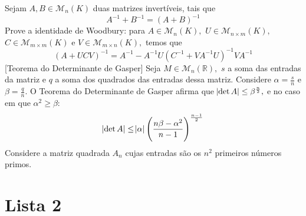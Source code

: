 \documentclass[11pt,a4paper]{article}
\begin{document}
 Sejam $A, B \in \mathcal{M}_n(K)$ duas matrizes invertíveis, tais que
\[
A^{-1} + B^{-1} = (A + B)^{-1}
\]
    \solucao{}
     Prove a identidade de Woodbury: para $A \in \mathcal{M}_n(K),$ $U \in \mathcal{M}_{n \times m}(K),$ $C \in \mathcal{M}_{m \times m}(K)$ e $V \in \mathcal{M}_{m \times n}(K),$ temos que
    \[\left(A + UCV \right)^{-1} = A^{-1} - A^{-1}U \left(C^{-1} + VA^{-1}U \right)^{-1} VA^{-1}
    \]
    \solucao{}
     [Teorema do Determinante de Gasper] 
    Seja $M \in \mathcal{M}_n(\mathbb{R}),$ $s$ a soma das entradas da matriz e $q$ a soma dos quadrados das entradas dessa matriz. Considere $\alpha = \frac{s}{n}$ e $\beta = \frac{q}{n}.$ O Teorema do Determinante de Gasper afirma que $\abs{\det A} \le \beta^{\frac{n}{2}},$ e no caso em que $\alpha^2 \ge \beta:$
    \[
    \abs{\det A} \le \abs{\alpha} \left(  \frac{n \beta - \alpha^2 }{n-1} \right)^{\frac{n-1}{2}}
    \]
        \solucao{}
     Considere a matriz quadrada $A_n$ cujas entradas são os $n^2$ primeiros números primos. 
    

\newpage
\section{\textcolor{Floresta}{Lista 2}}
\end{document}

